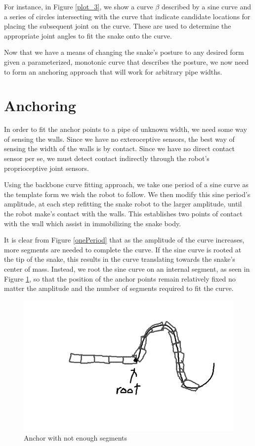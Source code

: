 For instance, in Figure \ref{plot_3}, we show a curve $\beta$ described by a sine curve and a series of circles intersecting with the curve that indicate candidate locations for placing the subsequent joint on the curve.  These are used to determine the appropriate joint angles to fit the snake onto the curve.

Now that we have a means of changing the snake’s posture to any desired form given a parameterized, monotonic curve that describes the posture, we now need to form an anchoring approach that will work for arbitrary pipe widths.


\section{Anchoring}

In order to fit the anchor points to a pipe of unknown width, we need some way of sensing the walls.  Since we have no exteroceptive sensors, the best way of sensing the width of the walls is by contact.  Since we have no direct contact sensor per se, we must detect contact indirectly through the robot’s proprioceptive joint sensors.

Using the backbone curve fitting approach, we take one period of a sine curve as the template form we wish the robot to follow.  We then modify this sine period’s amplitude, at each step refitting the snake robot to the larger amplitude, until the robot make’s contact with the walls.  This establishes two points of contact with the wall which assist in immobilizing the snake body.

It is clear from Figure \ref{onePeriod} that as the amplitude of the curve increases, more segments are needed to complete the curve.  If the sine curve is rooted at the tip of the snake, this results in the curve translating towards the snake’s center of mass.  Instead, we root the sine curve on an internal segment, as seen in Figure \ref{anchor1}, so that the position of the anchor points remain relatively fixed no matter the amplitude and the number of segments required to fit the curve.

\begin{figure}
\begin{center}
\includegraphics[scale=0.5]{2_anchoring_1.png}
\end{center}
\caption{Anchor with not enough segments}
\label{anchor1}
\end{figure}


